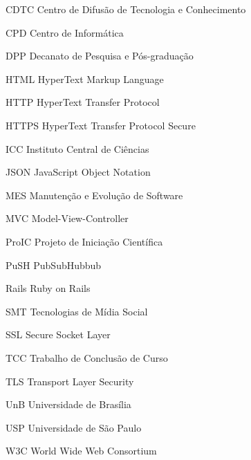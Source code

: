 \begin{siglas}
  \item[CDTC] Centro de Difusão de Tecnologia e Conhecimento
  \item[CPD] Centro de Informática
  \item[DPP] Decanato de Pesquisa e Pós-graduação
  \item[HTML] HyperText Markup Language
  \item[HTTP] HyperText Transfer Protocol
  \item[HTTPS] HyperText Transfer Protocol Secure
  \item[ICC] Instituto Central de Ciências
  \item[JSON] JavaScript Object Notation
  \item[MES] Manutenção e Evolução de Software
  \item[MVC] Model-View-Controller
  \item[ProIC] Projeto de Iniciação Científica
  \item[PuSH] PubSubHubbub
  \item[Rails] Ruby on Rails
  \item[SMT] Tecnologias de Mídia Social
  \item[SSL] Secure Socket Layer
  \item[TCC] Trabalho de Conclusão de Curso
  \item[TLS] Transport Layer Security
  \item[UnB] Universidade de Brasília
  \item[USP] Universidade de São Paulo
  \item[W3C] World Wide Web Consortium
\end{siglas}
